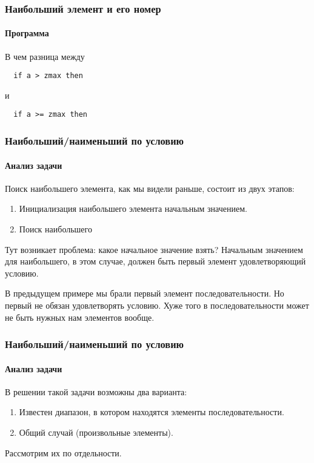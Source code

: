 \begin{frame}[fragile]
\frametitle{Наибольший элемент и его номер}
\framesubtitle{Программа}

\setlength{\columnsep}{-1cm}
\begin{multicols}{2}


\columnbreak

В чем разница между 

\begin{verbatim}
  if a > zmax then
\end{verbatim}

и
\begin{verbatim}
  if a >= zmax then
\end{verbatim}


\end{multicols}



\end{frame}


\begin{frame}[fragile]
\frametitle{Наибольший/наименьший по условию}
\framesubtitle{Анализ задачи}

Поиск наибольшего элемента, как мы видели раньше, состоит из двух этапов:
\begin{enumerate}
	\item Инициализация наибольшего элемента начальным значением.
	\item Поиск наибольшего
\end{enumerate}

 Тут возникает проблема: какое начальное значение взять? Начальным значением для наибольшего, в этом случае, должен быть первый элемент удовлетворяющий условию. 

В предыдущем примере мы брали первый элемент последовательности. Но первый не обязан удовлетворять условию. Хуже того в последовательности может не быть нужных нам элементов вообще.

\end{frame}

\begin{frame}[fragile]
\frametitle{Наибольший/наименьший по условию}
\framesubtitle{Анализ задачи}

В решении такой задачи возможны два варианта:

\begin{enumerate}
	\item Известен диапазон, в котором находятся элементы последовательности.
	\item Общий случай (произвольные элементы).
\end{enumerate}

Рассмотрим их по отдельности.
\end{frame}


